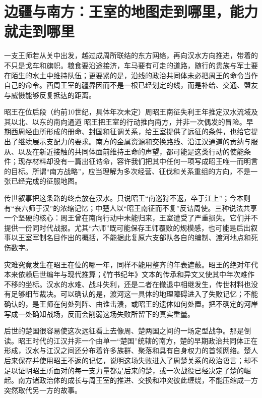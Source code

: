 \section{边疆与南方：王室的地图走到哪里，能力就走到哪里}

一支王师若从关中出发，越过成周所联结的东方网络，再向汉水方向推进，带着的不只是戈车和旗帜。粮食要沿途接济，车马要有可走的道路，随行的贵族与军士要在陌生的水土中维持队伍；更要紧的是，沿线的政治共同体未必把周王的命令当作自己的命令。西周王室的疆界因而不是一根已经划定的线，而是补给、交通、盟友与威慑能够反复抵达的距离。

\begin{event}{昭王在位后段（约前10世纪，具体年次未定）}{周昭王南征失利}{王年推定}{汉水流域及其以北、以东的南向通道}
昭王把王室的行动推向南方，并非一次偶发的冒险。早期西周经由所形成的册命、封国和征调关系，给王室提供了远征的条件，也给它提出了继续展示支配力的要求。南方的金属资源和交换路线、沿江汉通道的贡纳与服从、以及在新近接触的共同体面前维持王命的声望，都可能是这类行动的使能条件；现存材料却没有一篇出征诰命，容许我们把其中任何一项写成昭王唯一而明言的目标。所谓“南方战略”，应当理解为多次经营、征伐和关系重组的方向，不是一张已经完成的征服地图。

传世叙事把这条路的终点放在汉水。只说昭王“南巡狩不返，卒于江上”；今本则有“丧六师于汉”的浓缩记忆；中楚人以“昭王南征而不复”反诘周使。三种说法共享一个坚硬的核心：周王曾在南向行动中未能归来，王室遭受了严重损失。它们并不提供一份同时代战报。尤其“六师”既可能保存王师覆败的规模感，也可能是后出叙事以王室军制名目作出的概括，不能据此复原六支部队各自的编制、渡河地点和死伤数字。

灾难究竟发生在昭王在位的哪一年，同样不能用整齐的年表遮蔽。昭王的绝对年代本来依赖后世编年与现代推算；《竹书纪年》文本的传承和异文又使其中年次难作不移的坐标。汉水的水难、战斗失利，还是二者在撤退中相继发生，传世材料也没有足够细节裁决。可以确认的是，渡河这一具体的地理障碍进入了失败记忆；不能确认的，是王师在何处列阵、由谁击溃，或昭王的遗体如何处置。把不确定的河岸写成一处确知战场，反而会削弱这场失败所留下的真实重量。

后世的楚国很容易使这次远征看上去像周、楚两国之间的一场定型战争。那是倒读。昭王时代的江汉并非一个由单一“楚国”统辖的南方，楚的早期政治共同体正在形成，汉水与江汉之间还分布着许多族群、聚落和具有自身权力的首领网络。楚人后来保存并使用昭王不返的记忆，说明这场失败进入了周楚关系的政治语言；却不足以证明昭王所面对的每一支力量都是后来的楚，或一次战役已经决定了楚的崛起。南方诸政治体的成长与周王室的推进、交换和冲突彼此缠绕，不能压缩成一方突然取代另一方的故事。


\end{event}
